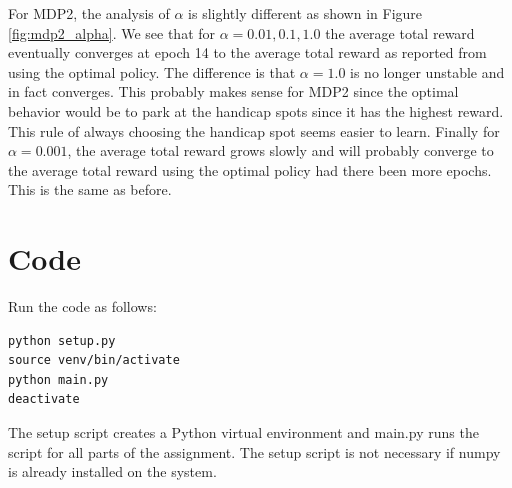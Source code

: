 \documentclass[paper=a4, fontsize=11pt]{scrartcl}
\begin{document}
For MDP2, the analysis of $\alpha$ is slightly different as shown in Figure \ref{fig:mdp2_alpha}. We see that for $\alpha=0.01, 0.1, 1.0$ the average total reward eventually converges at epoch 14 to the average total reward as reported from using the optimal policy. The difference is that $\alpha=1.0$ is no longer unstable and in fact converges. This probably makes sense for MDP2 since the optimal behavior would be to park at the handicap spots since it has the highest reward. This rule of always choosing the handicap spot seems easier to learn. Finally for $\alpha=0.001$, the average total reward grows slowly and will probably converge to the average total reward using the optimal policy had there been more epochs. This is the same as before.

\section{Code}

Run the code as follows:

\begin{verbatim}
python setup.py
source venv/bin/activate
python main.py
deactivate
\end{verbatim}

The setup script creates a Python virtual environment and main.py runs the script for all parts of the assignment. The setup script is not necessary if numpy is already installed on the system.
\end{document}
